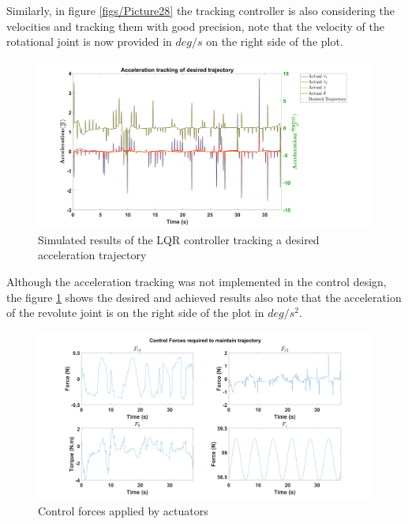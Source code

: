 \documentclass{UoNMCHA}
\numberwithin{equation}{section}
\begin{document}
 Similarly, in figure \ref{figs/Picture28} the tracking controller is also considering the velocities and tracking them with good precision, note that the velocity of the rotational joint is now provided in $ deg/s $ on the right side of the plot.
	
	\begin{figure}[H]
		\begin{center}
			\includegraphics[width=1\linewidth]{figs/Picture29}
			\caption{Simulated results of the LQR controller tracking a desired acceleration trajectory}
			\label{figs/Picture29}
		\end{center}
	\end{figure}
	
	 Although the acceleration tracking was not implemented in the control design, the figure \ref{figs/Picture29} shows the desired and achieved results also note that the acceleration of the revolute joint is on the right side of the plot in $ deg/s^2 $.

	
	\begin{figure}[H]
		\begin{center}
			\includegraphics[width=1\linewidth]{figs/Picture30}
			\caption{Control forces applied by actuators}
			\label{figs/Picture30}
		\end{center}
	\end{figure}
	
\end{document}
